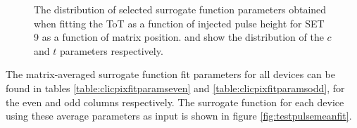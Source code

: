\begin{figure}[h!]
\centering
{}
\caption[The distribution of selected surrogate function parameters obtained when fitting the ToT as a function of injected pulse height for SET 9 as a function of matrix position.  \protect{} and \protect{} show the distribution of the $c$ and $t$ parameters respectively.]{The distribution of selected surrogate function parameters obtained when fitting the ToT as a function of injected pulse height for SET 9 as a function of matrix position.  \protect{} and \protect{} show the distribution of the $c$ and $t$ parameters respectively.}
\label{fig:fitparams2d}
\end{figure}

The matrix-averaged surrogate function fit parameters for all devices can be found in tables \ref{table:clicpixfitparamseven} and  \ref{table:clicpixfitparamsodd}, for the even and odd columns respectively.  The surrogate function for each device using these average parameters as input is shown in figure \ref{fig:testpulsemeanfit}.

